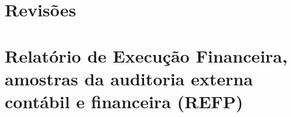 \documentclass[a4paper,11pt,oneside,brazilian,
draft=false]{report}%
\begin{document}




%



% 



%



%
 

\chapter{Revisões}
















\chapter{Relatório de Execução Financeira, amostras da auditoria externa
contábil e financeira (REFP)}

\end{document}
